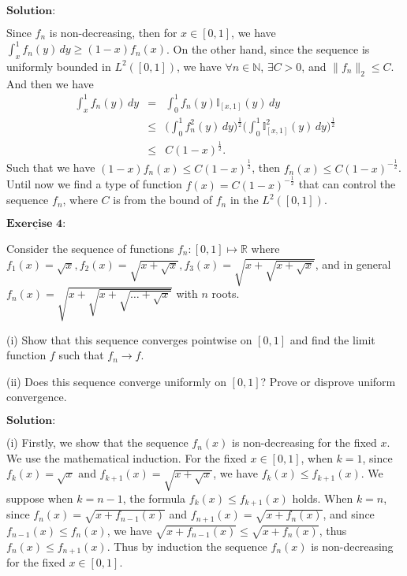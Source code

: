 \documentclass[12pt,a4paper]{ctexart}
\begin{document}
\vspace{8pt}
$\textbf{Solution:}$

Since $f_{n}$ is non-decreasing, then for $x \in [0, 1]$, we have $\int_{x}^{1} f_{n}(y) \, d y \geq (1-x) f_{n}(x)$. On the other hand, since the sequence is uniformly bounded in $L^{2}([0, 1])$, we have $\forall n \in \mathbb{N}$, $\exists C > 0$, and $\| f_{n} \|_{2} \leq C$. And then we have
\begin{eqnarray*}
\int_{x}^{1} f_{n}(y) \, d y &=& \int_{0}^{1} f_{n}(y) \mathbb{I}_{[x, 1]} (y) \, d y  \\
            &\leq & \Big( \int_{0}^{1} f^{2}_{n}(y) \, d y \Big)^{\frac{1}{2}} \Big( \int_{0}^{1} \mathbb{I}^{2}_{[x, 1]} (y) \, d y \Big)^{\frac{1}{2}} \\
            &\leq & C (1-x)^{\frac{1}{2}}.
\end{eqnarray*}
Such that we have $(1-x) f_{n}(x) \leq C (1-x)^{\frac{1}{2}}$, then $f_{n}(x) \leq C (1-x)^{- \frac{1}{2}}$. Until now we find a type of function $f(x) = C (1-x)^{- \frac{1}{2}}$ that can control the sequence $f_{n}$, where $C$ is from the bound of $f_{n}$ in the $L^{2}([0, 1])$.

\newpage

$\underline{\textbf{Exercise 4:}}$

Consider the sequence of functions $f_{n}: [0, 1] \mapsto \mathbb{R}$ where $f_{1}(x) = \sqrt{x}, f_{2}(x) = \sqrt{x + \sqrt{x}}, f_{3}(x) = \sqrt{x + \sqrt{x + \sqrt{x}}}$, and in general $f_{n}(x) = \sqrt{x + \sqrt{x + \sqrt{\dots + \sqrt{x}}}}$ with $n$ roots.

(i) Show that this sequence converges pointwise on $[0, 1]$ and find the limit function $f$ such that $f_{n} \rightarrow f$.

(ii) Does this sequence converge uniformly on $[0, 1]$? Prove or disprove uniform convergence.

\vspace{8pt}
$\textbf{Solution:}$

(i) Firstly, we show that the sequence $f_{n}(x)$ is non-decreasing for the fixed $x$. We use the mathematical induction. For the fixed $x \in [0, 1]$, when $k = 1$, since $f_{k} (x) = \sqrt{x}$ and $f_{k+1} (x) = \sqrt{x + \sqrt{x}}$, we have $f_{k}(x) \leq f_{k+1}(x)$. We suppose when $k = n-1$, the formula $f_{k}(x) \leq f_{k+1}(x)$ holds. When $k = n$, since $f_{n}(x) = \sqrt{x + f_{n-1}(x)}$ and $f_{n+1}(x) = \sqrt{x + f_{n}(x)}$, and since $f_{n-1}(x) \leq f_{n}(x)$, we have $\sqrt{x + f_{n-1}(x)} \leq \sqrt{x + f_{n}(x)}$, thus $f_{n}(x) \leq f_{n+1}(x)$. Thus by induction the sequence $f_{n}(x)$ is non-decreasing for the fixed $x \in [0,1]$.
\end{document}
